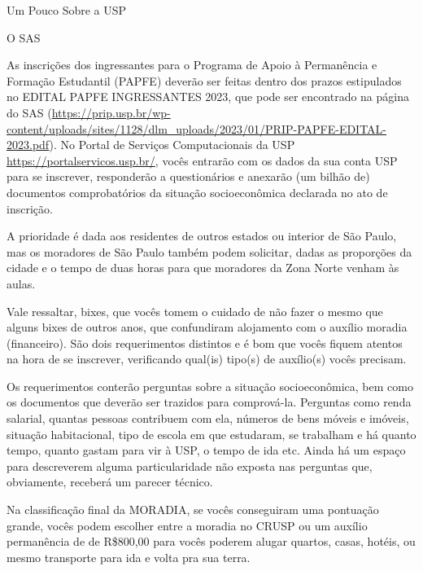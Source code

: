 \begin{secao}{Um Pouco Sobre a USP}
\begin{subsecao}{O SAS}


As inscrições dos ingressantes para o Programa de Apoio à Permanência e Formação Estudantil (PAPFE)
deverão ser feitas dentro dos prazos estipulados no EDITAL PAPFE INGRESSANTES 2023, que pode 
ser encontrado na página do SAS (\url{https://prip.usp.br/wp-content/uploads/sites/1128/dlm_uploads/2023/01/PRIP-PAPFE-EDITAL-2023.pdf}).
No Portal de Serviços Computacionais da USP \url{https://portalservicos.usp.br/}, vocês entrarão 
com os dados da sua conta USP para se inscrever, responderão a questionários e anexarão (um bilhão de) 
documentos comprobatórios da situação socioeconômica declarada no ato de inscrição.

A prioridade é dada aos residentes de outros estados ou interior de São Paulo,
mas os moradores de São Paulo também podem solicitar, dadas as proporções da
cidade e o tempo de duas horas para que moradores da Zona Norte venham às aulas.

Vale ressaltar, bixes, que vocês tomem o cuidado de não fazer o mesmo que alguns
bixes de outros anos, que confundiram alojamento com o auxílio moradia (financeiro). São dois
requerimentos distintos e é bom que vocês fiquem atentos na hora de se inscrever, verificando
qual(is) tipo(s) de auxílio(s) vocês precisam.

Os requerimentos conterão perguntas sobre a situação socioeconômica, bem como os
documentos que deverão ser trazidos para comprová-la. Perguntas como renda
salarial, quantas pessoas contribuem com ela, números de bens móveis e imóveis,
situação habitacional, tipo de escola em que estudaram, se trabalham e há quanto
tempo, quanto gastam para vir à USP, o tempo de ida etc. Ainda há um espaço
para descreverem alguma particularidade não exposta nas perguntas que, obviamente,
receberá um parecer técnico.

Na classificação final da MORADIA, se vocês conseguiram uma pontuação grande, vocês
podem escolher entre a moradia no CRUSP ou um auxílio permanência de 
de R\$800,00 para vocês poderem alugar quartos, casas, hotéis, ou mesmo transporte
para ida e volta pra sua terra.


\end{subsecao}
\end{secao}
